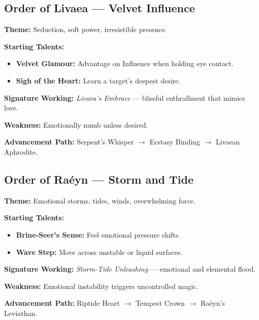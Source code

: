 \documentclass[11pt]{book}
\begin{document}
\subsection*{Order of Livaea --- Velvet Influence}
\begin{tcolorbox}[colback=mistgray!10, colframe=lanternamber, title={The Velvet Enchantress}]
\textbf{Theme:} Seduction, soft power, irresistible presence.

\textbf{Starting Talents:}
\begin{itemize}[noitemsep]
    \item \textbf{Velvet Glamour:} Advantage on Influence when holding eye contact.
    \item \textbf{Sigh of the Heart:} Learn a target's deepest desire.
\end{itemize}

\textbf{Signature Working:} \emph{Livaea's Embrace} --- blissful enthrallment 
that mimics love.

\textbf{Weakness:} Emotionally numb unless desired.

\textbf{Advancement Path:} Serpent's Whisper $\rightarrow$ Ecstasy Binding 
$\rightarrow$ Livaean Aphrodite.
\end{tcolorbox}

\subsection*{Order of Raéyn --- Storm and Tide}
\begin{tcolorbox}[colback=mistgray!10, colframe=shadowviolet, title={The Tidecaller Witch}]
\textbf{Theme:} Emotional storms, tides, winds, overwhelming force.

\textbf{Starting Talents:}
\begin{itemize}[noitemsep]
    \item \textbf{Brine-Seer's Sense:} Feel emotional pressure shifts.
    \item \textbf{Wave Step:} Move across unstable or liquid surfaces.
\end{itemize}

\textbf{Signature Working:} \emph{Storm-Tide Unleashing} --- emotional and 
elemental flood.

\textbf{Weakness:} Emotional instability triggers uncontrolled magic.

\textbf{Advancement Path:} Riptide Heart $\rightarrow$ Tempest Crown 
$\rightarrow$ Raéyn's Leviathan.
\end{tcolorbox}
\end{document}
